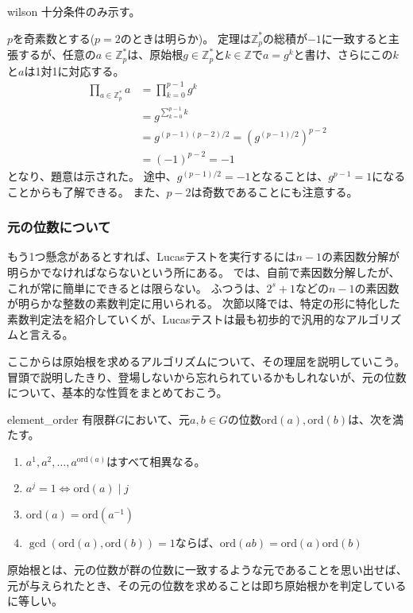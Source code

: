 \begin{thProof}{wilson}
十分条件のみ示す。

$p$を奇素数とする($p=2$のときは明らか)。
定理は$\mathbb{Z}_p^*$の総積が$-1$に一致すると主張するが、任意の$a\in\mathbb{Z}_p^*$は、原始根$g\in\mathbb{Z}_p^*$と$k\in\mathbb{Z}$で$a=g^k$と書け、さらにこの$k$と$a$は1対1に対応する。
\begin{align*}
\prod_{a \in \mathbb{Z}_p^*} a &= \prod_{k=0}^{p-1} g^k\\
 &= g^{\sum_{k=0}^{p-1}k}\\
 &= g^{(p-1)(p-2)/2} = (g^{(p-1)/2})^{p-2}\\
 &= (-1)^{p-2} = -1
\end{align*}
となり、題意は示された。
途中、$g^{(p-1)/2}=-1$となることは、$g^{p-1}=1$になることからも了解できる。
また、$p-2$は奇数であることにも注意する。
\end{thProof}

\subsubsection{元の位数について}
もう1つ懸念があるとすれば、Lucasテストを実行するには$n-1$の素因数分解が明らかでなければならないという所にある。
では、自前で素因数分解したが、これが常に簡単にできるとは限らない。
ふつうは、$2^s+1$などの$n-1$の素因数が明らかな整数の素数判定に用いられる。
次節以降では、特定の形に特化した素数判定法を紹介していくが、Lucasテストは最も初歩的で汎用的なアルゴリズムと言える。

ここからは原始根を求めるアルゴリズムについて、その理屈を説明していこう。
冒頭で説明したきり、登場しないから忘れられているかもしれないが、元の位数について、基本的な性質をまとめておこう。

\begin{Prop}{}{element_order}
有限群$G$において、元$a,b\in G$の位数$\mbox{ord}(a), \mbox{ord}(b)$は、次を満たす。
\begin{enumerate}
\item $a^1,a^2,\ldots,a^{\mbox{ord}(a)}$はすべて相異なる。
\item $a^j=1 \iff \mbox{ord}(a) \mid j$
\item $\mbox{ord}(a) = \mbox{ord}(a^{-1})$
\item $\gcd(\mbox{ord}(a), \mbox{ord}(b))=1$ならば、$\mbox{ord}(ab)=\mbox{ord}(a)\mbox{ord}(b)$
\end{enumerate}
\end{Prop}

原始根とは、元の位数が群の位数に一致するような元であることを思い出せば、元が与えられたとき、その元の位数を求めることは即ち原始根かを判定しているに等しい。


